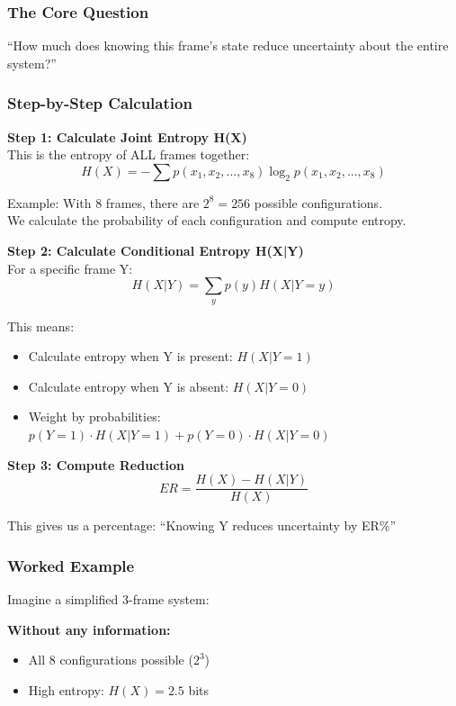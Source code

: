\documentclass[11pt]{article}
\begin{document}
\subsubsection{The Core Question}
``How much does knowing this frame's state reduce uncertainty about the entire system?''

\subsubsection{Step-by-Step Calculation}

\begin{tcolorbox}[mybox={Detailed Entropy Reduction Calculation}]
\textbf{Step 1: Calculate Joint Entropy H(X)}\\
This is the entropy of ALL frames together:
\[H(X) = -\sum p(x_1, x_2, ..., x_8) \log_2 p(x_1, x_2, ..., x_8)\]

Example: With 8 frames, there are $2^8 = 256$ possible configurations.\\
We calculate the probability of each configuration and compute entropy.

\textbf{Step 2: Calculate Conditional Entropy H(X|Y)}\\
For a specific frame Y:
\[H(X|Y) = \sum_{y} p(y) H(X|Y=y)\]

This means:
\begin{itemize}
    \item Calculate entropy when Y is present: $H(X|Y=1)$
    \item Calculate entropy when Y is absent: $H(X|Y=0)$
    \item Weight by probabilities: $p(Y=1) \cdot H(X|Y=1) + p(Y=0) \cdot H(X|Y=0)$
\end{itemize}

\textbf{Step 3: Compute Reduction}
\[ER = \frac{H(X) - H(X|Y)}{H(X)}\]

This gives us a percentage: ``Knowing Y reduces uncertainty by ER\%''
\end{tcolorbox}

\subsubsection{Worked Example}

Imagine a simplified 3-frame system:

\textbf{Without any information:}
\begin{itemize}
    \item All 8 configurations possible ($2^3$)
    \item High entropy: $H(X) = 2.5$ bits
\end{itemize}
\end{document}
